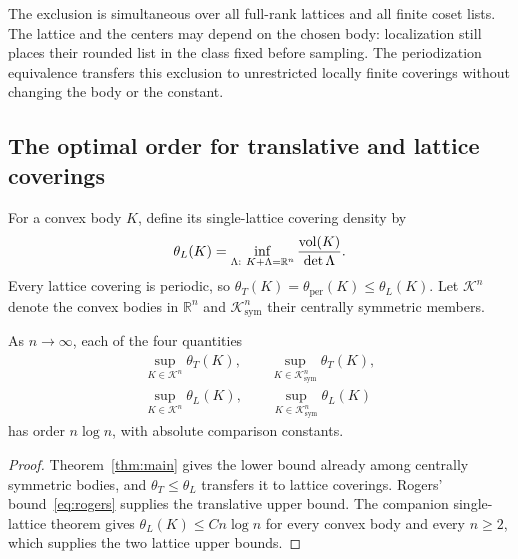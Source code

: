 The exclusion is simultaneous over all full-rank lattices and all finite
coset lists. The lattice and the centers may depend on the chosen body:
localization still places their rounded list in the class fixed before
sampling. The periodization equivalence transfers this exclusion to
unrestricted locally finite coverings without changing the body or the
constant.

\subsection{The optimal order for translative and lattice coverings}

For a convex body $K$, define its single-lattice covering density by
\[
 \theta_L(K)=\inf_{\Lambda:\ K+\Lambda=\mathbb R^n}
                   \frac{\operatorname{vol}(K)}{\det\Lambda}.
\]
Every lattice covering is periodic, so
$\theta_T(K)=\theta_{\mathrm{per}}(K)\le\theta_L(K)$.
Let $\mathcal K^n$ denote the convex bodies in $\mathbb R^n$ and
$\mathcal K^n_{\mathrm{sym}}$ their centrally symmetric members.

\begin{corollary}\label{cor:sharp-order}
As $n\to\infty$, each of the four quantities
\begin{gather*}
 \sup_{K\in\mathcal K^n}\theta_T(K),\qquad
 \sup_{K\in\mathcal K^n_{\mathrm{sym}}}\theta_T(K),\\
 \sup_{K\in\mathcal K^n}\theta_L(K),\qquad
 \sup_{K\in\mathcal K^n_{\mathrm{sym}}}\theta_L(K)
\end{gather*}
has order $n\log n$, with absolute comparison constants.
\end{corollary}
\begin{proof}
Theorem~\ref{thm:main} gives the lower bound already among centrally
symmetric bodies, and $\theta_T\le\theta_L$ transfers it to lattice
coverings. Rogers' bound~\eqref{eq:rogers} supplies the translative upper
bound. The companion single-lattice theorem
\cite[Theorem~1.1]{OpenAI2026SingleLattice} gives
$\theta_L(K)\le Cn\log n$ for every convex body and every $n\ge2$,
which supplies the two lattice upper bounds.
\end{proof}
